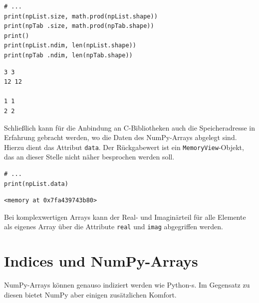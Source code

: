 \begin{codebox}[Beispiel: Anzahl Elemente \& Dimensionen, width=.57\linewidth, nobeforeafter, equal height group = grpXmpSimpleNDimsElements]
\begin{verbatim}
# ...
print(npList.size, math.prod(npList.shape))
print(npTab .size, math.prod(npTab.shape))
print()
print(npList.ndim, len(npList.shape))
print(npTab .ndim, len(npTab.shape))
\end{verbatim}
\end{codebox}
%
\hspace{0.5cm}
\begin{cmdbox}[Anzahl Elemente \& Dimensionen, width=.4\linewidth, nobeforeafter, equal height group = grpXmpSimpleNDimsElements]
\begin{verbatim}
3 3
12 12

1 1
2 2
\end{verbatim}
\end{cmdbox}

Schließlich kann für die Anbindung an C-Bibliotheken auch die Speicheradresse in Erfahrung gebracht werden, wo die Daten des NumPy-Arrays abgelegt sind. Hierzu dient das Attribut \texttt{data}. Der Rückgabewert ist ein \texttt{MemoryView}-Objekt, das an dieser Stelle nicht näher besprochen werden soll.

\begin{codebox}[Beispiel: Adresse eines Arrays, width=.57\linewidth, nobeforeafter, equal height group = grpXmpNumPyMemory]
\begin{verbatim}
# ...
print(npList.data)
\end{verbatim}
\end{codebox}
%
\hspace{0.5cm}
\begin{cmdbox}[Ausgabe: Adresse eines Arrays, width=.4\linewidth, nobeforeafter, equal height group = grpXmpNumPyMemory]
\begin{verbatim}
<memory at 0x7fa439743b80>
\end{verbatim}
\end{cmdbox}

Bei komplexwertigen Arrays kann der Real- und Imaginärteil für alle Elemente als eigenes Array über die Attribute \texttt{real} und \texttt{imag} abgegriffen werden.

\section{Indices und NumPy-Arrays}
NumPy-Arrays können genauso indiziert werden wie Python-s. Im Gegensatz zu diesen bietet NumPy aber einigen zusätzlichen Komfort.

